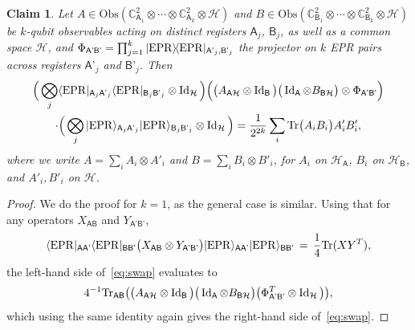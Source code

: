 \documentclass[11pt]{article}
\numberwithin{equation}{section}
\newtheorem{claim}[theorem]{Claim}
\theoremstyle{definition}
\theoremstyle{plain}
\newcommand{\C}{\mathbb C}
\newcommand{\ket}[1]{|#1\rangle}
\newcommand{\bra}[1]{\langle#1|}
\newcommand{\proj}[1]{\ket{#1}\!\bra{#1}}
\newcommand{\Tr}{\mbox{\rm Tr}}
\newcommand{\Id}{\ensuremath{\mathop{\rm Id}\nolimits}}
\newcommand{\setft}[1]{\mathrm{#1}}
\newcommand{\Obs}{\setft{Obs}}
\newcommand{\reg}[1]{{\textsf{#1}}}
\newcommand{\mH}{\mathcal{H}}
\newcommand{\EPR}{{\rm EPR}}
\begin{document}
\begin{claim}\label{claim:swap-tt}
Let $A\in \Obs(\C^2_{\reg{A}_1}\otimes \cdots\otimes \C^2_{\reg{A}_k} \otimes \mH)$ and $B\in \Obs(\C^2_{\reg{B}_1}\otimes \cdots\otimes \C^2_{\reg{B}_k}\otimes \mH)$ be $k$-qubit observables acting on distinct registers $\reg{A}_j$, $\reg{B}_j$, as well as a common space $\mH$, and $\Phi_{\reg{A'B'}} = \prod_{j=1}^k \proj{\EPR}_{\reg{A'}_j,\reg{B'}_j}$ the projector on $k$ EPR pairs across registers $\reg{A'}_j$ and $\reg{B'}_j$.  Then 
\begin{multline}    %
%
 \Big(\bigotimes_j \bra{\EPR}_{\reg{A}_j\reg{A'}_j}\bra{\EPR}_{\reg{B}_j\reg{B'}_j} \otimes \Id_{\mH} \Big)\Big(\big(A_{\reg{A}\mH} \otimes \Id_\reg{B}\big)\big( \Id_\reg{A}\otimes B _{\reg{B}\mH}\big)\otimes \Phi_{\reg{A'B'}}\Big) \\
\cdot \Big(\bigotimes_j \ket{\EPR}_{\reg{A}_j\reg{A'}_j}\ket{\EPR}_{\reg{B}_j\reg{B'}_j} \otimes \Id_\mH\Big) = \frac{1}{2^{2k}}\sum_i \Tr\big(A_i B_i\big) A'_iB'_i,\label{eq:swap}
\end{multline}
where we write $A = \sum_i A_i \otimes A'_i$ and $B=\sum_i B_i\otimes B'_i$, for $A_i$ on $\mH_\reg{A}$, $B_i$ on $\mH_{\reg{B}}$, and $A'_i,B'_i$ on $\mH$.
\end{claim}


\begin{proof}
We do the proof for $k=1$, as the general case is similar. Using that for any operators $X_{\reg{AB}} $ and $ Y_{\reg{A'B'}}$, 
$$\bra{\EPR}_{\reg{AA'}}\bra{\EPR}_{\reg{BB'}} \big( X_{\reg{AB}} \otimes Y_{\reg{A'B'}} \big) \ket{\EPR}_{\reg{AA'}}\ket{\EPR}_{\reg{BB'}} \,=\, \frac{1}{4}\Tr(XY^T),$$
the left-hand side of~\eqref{eq:swap} evaluates to 
$$4^{-1} \Tr_{\reg{AB}}\big( \big(A_{\reg{A}\mH} \otimes \Id_\reg{B}\big)\big( \Id_\reg{A}\otimes B _{\reg{B}\mH}\big)\big(\Phi_{\reg{A'B'}}^T\otimes \Id_\mH\big)\big),$$
 which using the same identity again 
gives the right-hand side of~\eqref{eq:swap}.
\end{proof} %
\end{document}
